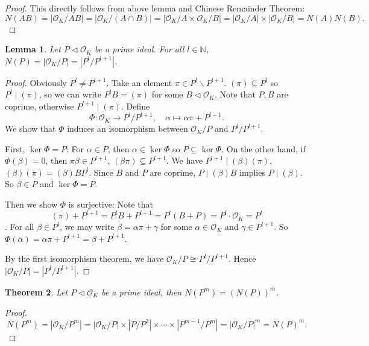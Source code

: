 \documentclass[11pt]{book}
\newtheorem{theorem}{Theorem}[section]
\newtheorem{lemma}[theorem]{Lemma}
\begin{document}
\begin{proof}
    This directly follows from above lemma and Chinese Remainder Theorem: 
    \[
    N(AB)=\left| \mathcal{O}_{K}/AB \right| =\left| \mathcal{O}_{K}/(A\cap B) \right| =\left| \mathcal{O}_{K}/A\times \mathcal{O}_{K}/B \right| =\left| \mathcal{O}_{K}/A \right| \times \left| \mathcal{O}_{K}/B \right| =N(A)N(B).
    \]
\end{proof}

\begin{lemma}
    Let $P\lhd \mathcal{O}_{K}$ be a prime ideal. For all $l\in \mathbb{N}$, $N(P)=\left| \mathcal{O}_{K} /P \right| =\left| P^{l}/P^{l+1} \right| $. 
\end{lemma}

\begin{proof}
    Obviously $P^{l}\neq P^{l+1}$. Take an element $\pi\in P^{l} \backslash P^{l+1}$. $(\pi)\subseteq P^{l}$ so $P^{l}\mid (\pi)$, so we can write $P^{l}B=(\pi)$ for some $B\lhd \mathcal{O}_{K}$. Note that $P,B$ are coprime, otherwise $P^{l+1}\mid (\pi)$. Define 
    \[
    \Phi: \mathcal{O}_{K}\to P^{l}/P^{l+1},\quad \alpha\mapsto \alpha \pi+P^{l+1}.
    \]
    We show that $\Phi$ induces an isomorphism between $\mathcal{O}_{K} /P$ and $P^{l}/P^{l+1}$. 

    First, $\ker \Phi=P$: For $\alpha\in P$, then $\alpha\in \ker\Phi$ so $P\subseteq \ker \Phi$. On the other hand, if $\Phi(\beta)=0$, then $\pi \beta\in P^{l+1}$, $(\beta\pi)\subseteq P^{l+1}$. We have $P^{l+1}\mid (\beta)(\pi)$, $(\beta)(\pi)=(\beta)BP^{l}$. Since $B$ and $P$ are coprime, $P\mid (\beta)B$ implies $P\mid (\beta)$. So $\beta\in P$ and $\ker \Phi=P$. 

    Then we show $\Phi$ is surjective: Note that 
    \[
    (\pi)+P^{l+1}=P^{l}B+P^{l+1}=P^{l}(B+P)=P^{l}\cdot \mathcal{O}_{K}=P^{l}
    \]. 
    For all $\beta\in P^{l}$, we may write $\beta=\alpha \pi+\gamma$ for some $\alpha\in \mathcal{O}_{K}$ and $\gamma\in P^{l+1}$. So $\Phi(\alpha)=\alpha\pi+P^{l+1}=\beta+P^{l+1}$. 

    By the first isomorphism theorem, we have $\mathcal{O}_{K}/P\cong P^{l}/P^{l+1}$. Hence $\left| \mathcal{O}_{K} /P \right|=\left| P^{l}/P^{l+1} \right|$. 
\end{proof}

\begin{theorem}
    Let $P\lhd \mathcal{O}_{K}$ be a prime ideal, then $N(P^{m})=(N(P))^{m}$. 
\end{theorem}

\begin{proof}
    \[N(P^{m})=\left| \mathcal{O}_{K}/P^{m} \right| =\left| \mathcal{O}_{K}/P \right| \times \left| P/P^{2} \right| \times\cdots\times \left| P^{m-1}/P^{m} \right|=\left| \mathcal{O}_{K}/P \right|^{m}=N(P)^{m}. \]
\end{proof}
\end{document}
